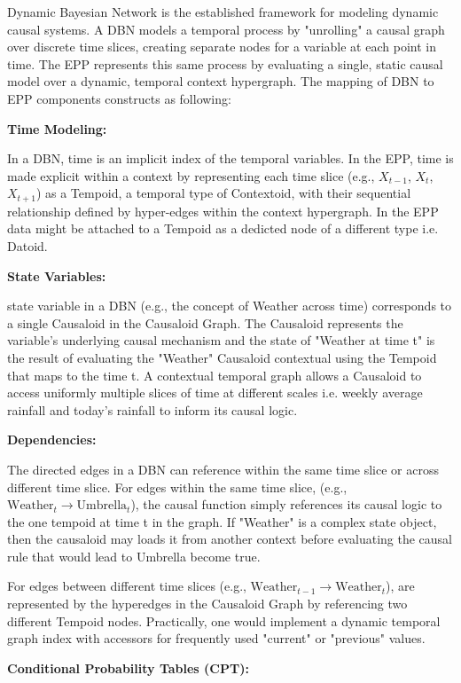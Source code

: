 Dynamic Bayesian Network is the established framework for modeling dynamic causal systems. A DBN models a temporal process by "unrolling" a causal graph over discrete time slices, creating separate nodes for a variable at each point in time. The EPP represents this same process   by evaluating a single, static causal model over a dynamic, temporal context hypergraph. The mapping of DBN to EPP components constructs as following:
 
 \textbf{Time Modeling:}
 
 In a DBN, time is an implicit index of the temporal variables. In the EPP, time is made explicit within a
 context by representing each time slice (e.g., $X_{t-1}$, $X_t$, $X_{t+1}$) as a Tempoid, a temporal type of Contextoid, with their sequential relationship defined by hyper-edges within the context hypergraph. In the EPP data might be attached to a Tempoid as a dedicted node of a different type i.e. Datoid. 

 \textbf{State Variables:}
 
state variable in a DBN (e.g., the concept of Weather across time) corresponds to a single Causaloid in the Causaloid Graph. The Causaloid represents the variable's underlying causal mechanism and the state of "Weather at time t" is the result of evaluating the "Weather" Causaloid contextual using the Tempoid that maps to the time t. A contextual temporal graph allows a Causaloid to access uniformly multiple slices of time at different scales i.e. weekly average rainfall and today's rainfall to inform its causal logic. 

\textbf{Dependencies:}

The directed edges in a DBN can reference  within the same time slice or across different time slice.
For edges within the same time slice, (e.g., $\text{Weather}_t \to \text{Umbrella}_t$), the causal function simply references its causal logic to the one tempoid at time t in the graph. If "Weather" is a complex state object, then the causaloid may loads it from another context before evaluating the causal rule that would lead to Umbrella become true.

For edges between different time slices (e.g., $\text{Weather}_{t-1} \to \text{Weather}_t$),  are represented by the hyperedges in the Causaloid Graph by referencing two different Tempoid nodes. Practically, one would implement a dynamic temporal graph index with accessors for frequently used "current" or "previous" values. 


\textbf{Conditional Probability Tables (CPT):}

